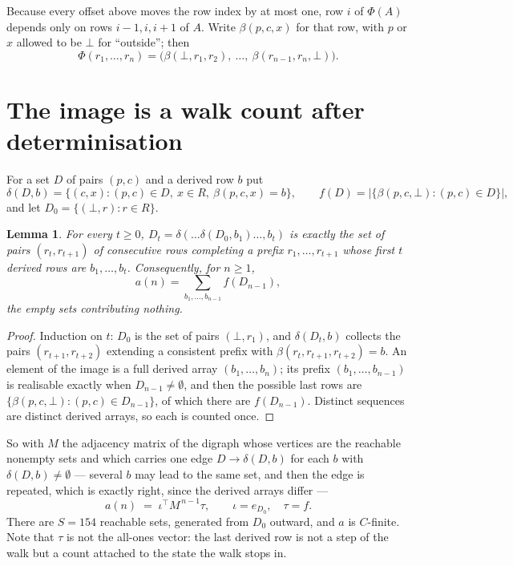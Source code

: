 \documentclass[11pt,a4paper]{article}
\theoremstyle{plain}
\newtheorem{lemma}[theorem]{Lemma}
\theoremstyle{definition}
\begin{document}
Because every offset above moves the row index by at most one, row $i$ of
$\Phi(A)$ depends only on rows $i-1,i,i+1$ of $A$. Write $\beta(p,c,x)$ for that row, with $p$
or $x$ allowed to be $\bot$ for ``outside''; then
\[
\Phi(r_1,\dots,r_n)=\bigl(\beta(\bot,r_1,r_2),\ \dots,\ \beta(r_{n-1},r_n,\bot)\bigr).
\]

\section{The image is a walk count after determinisation}

For a set $D$ of pairs $(p,c)$ and a derived row $b$ put
\[
\delta(D,b)=\{(c,x):(p,c)\in D,\ x\in R,\ \beta(p,c,x)=b\},\qquad
f(D)=\bigl|\{\beta(p,c,\bot):(p,c)\in D\}\bigr| ,
\]
and let $D_0=\{(\bot,r):r\in R\}$.

\begin{lemma}\label{lem:det}
For every $t\ge0$, $D_t=\delta(\dots\delta(D_0,b_1)\dots,b_t)$ is exactly the set of pairs
$(r_t,r_{t+1})$ of consecutive rows completing a prefix $r_1,\dots,r_{t+1}$ whose first $t$
derived rows are $b_1,\dots,b_t$. Consequently, for $n\ge1$,
\[
a(n)=\sum_{b_1,\dots,b_{n-1}}f(D_{n-1}),
\]
the empty sets contributing nothing.
\end{lemma}

\begin{proof}
Induction on $t$: $D_0$ is the set of pairs $(\bot,r_1)$, and $\delta(D_t,b)$ collects the
pairs $(r_{t+1},r_{t+2})$ extending a consistent prefix with
$\beta(r_t,r_{t+1},r_{t+2})=b$. An element of the image is a full derived array
$(b_1,\dots,b_n)$; its prefix $(b_1,\dots,b_{n-1})$ is realisable exactly when
$D_{n-1}\neq\emptyset$, and then the possible last rows are
$\{\beta(p,c,\bot):(p,c)\in D_{n-1}\}$, of which there are $f(D_{n-1})$. Distinct sequences
are distinct derived arrays, so each is counted once.
\end{proof}

So with $M$ the adjacency matrix of the digraph whose vertices are the reachable nonempty sets
and which carries one edge $D\to\delta(D,b)$ for each $b$ with $\delta(D,b)\neq\emptyset$ ---
several $b$ may lead to the same set, and then the edge is repeated, which is exactly right,
since the derived arrays differ ---
\[
a(n)\;=\;\iota^{\!\top}M^{\,n-1}\tau,\qquad \iota=e_{D_0},\quad \tau=f .
\]
There are $S=154$ reachable sets, generated from $D_0$ outward, and $a$ is $C$-finite.
Note that $\tau$ is not the all-ones vector: the last derived row is not a
step of the walk but a count attached to the state the walk stops in.
\end{document}

